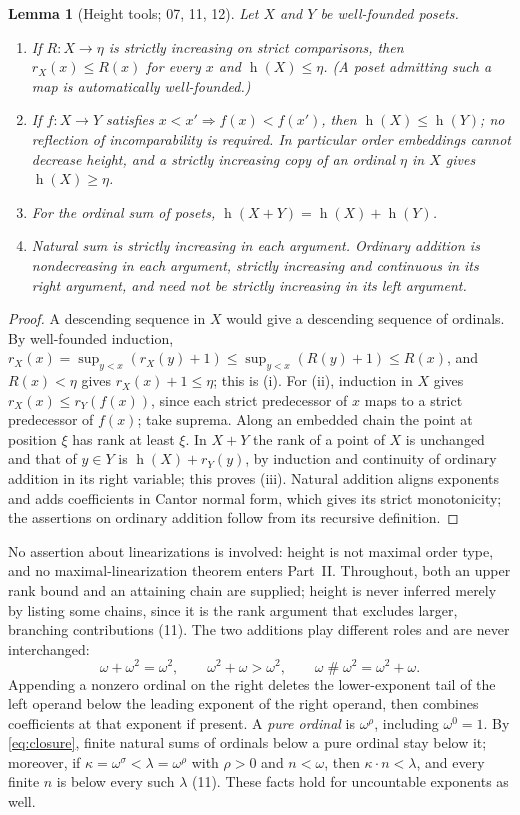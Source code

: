 \documentclass[11pt,a4paper]{article}
\newtheorem{lemma}[theorem]{Lemma}
\theoremstyle{definition}
\theoremstyle{remark}
\newcommand{\hgt}{\operatorname{h}}
\newcommand{\ns}{\mathbin{\#}}
\begin{document}
\begin{lemma}[Height tools; 07, 11, 12]\label{nh:lem:rankbound}
Let $X$ and $Y$ be well-founded posets.
\begin{enumerate}[label=(\roman*)]
\item If $R:X\to\eta$ is strictly increasing on strict comparisons, then
$r_X(x)\le R(x)$ for every $x$ and $\hgt(X)\le\eta$. (A poset admitting such
a map is automatically well-founded.)
\item If $f:X\to Y$ satisfies $x<x'\Rightarrow f(x)<f(x')$, then
$\hgt(X)\le\hgt(Y)$; no reflection of incomparability is required. In
particular order embeddings cannot decrease height, and a strictly
increasing copy of an ordinal $\eta$ in $X$ gives $\hgt(X)\ge\eta$.
\item For the ordinal sum of posets, $\hgt(X+Y)=\hgt(X)+\hgt(Y)$.
\item Natural sum is strictly increasing in each argument. Ordinary addition
is nondecreasing in each argument, strictly increasing and continuous in its
right argument, and need not be strictly increasing in its left argument.
\end{enumerate}
\end{lemma}
\begin{proof}
A descending sequence in $X$ would give a descending sequence of ordinals.
By well-founded induction,
$r_X(x)=\sup_{y<x}(r_X(y)+1)\le\sup_{y<x}(R(y)+1)\le R(x)$, and
$R(x)<\eta$ gives $r_X(x)+1\le\eta$; this is (i). For (ii), induction in $X$
gives $r_X(x)\le r_Y(f(x))$, since each strict predecessor of $x$ maps to a
strict predecessor of $f(x)$; take suprema. Along an embedded chain the point
at position $\xi$ has rank at least $\xi$. In $X+Y$ the rank of a point of $X$
is unchanged and that of $y\in Y$ is $\hgt(X)+r_Y(y)$, by induction and
continuity of ordinary addition in its right variable; this proves (iii).
Natural addition aligns exponents and adds coefficients in Cantor normal
form, which gives its strict monotonicity; the assertions on ordinary
addition follow from its recursive definition.
\end{proof}

No assertion about linearizations is involved: height is not maximal order
type, and no maximal-linearization theorem enters Part~II. Throughout, both
an upper rank bound and an attaining chain are supplied; height is never
inferred merely by listing some chains, since it is the rank argument that
excludes larger, branching contributions (11). The two additions
play different roles and are never interchanged:
\[
 \omega+\omega^2=\omega^2,\qquad \omega^2+\omega>\omega^2,\qquad
 \omega\ns\omega^2=\omega^2+\omega.
\]
Appending a nonzero ordinal on the right deletes the lower-exponent tail of
the left operand below the leading exponent of the right operand, then
combines coefficients at that exponent if present. A \emph{pure ordinal} is
$\omega^\rho$, including $\omega^0=1$. By \eqref{eq:closure}, finite natural
sums of ordinals below a pure ordinal stay below it; moreover, if
$\kappa=\omega^\sigma<\lambda=\omega^\rho$ with $\rho>0$ and $n<\omega$, then
$\kappa\cdot n<\lambda$, and every finite $n$ is below every such $\lambda$
(11). These facts hold for uncountable exponents as well.
\end{document}
